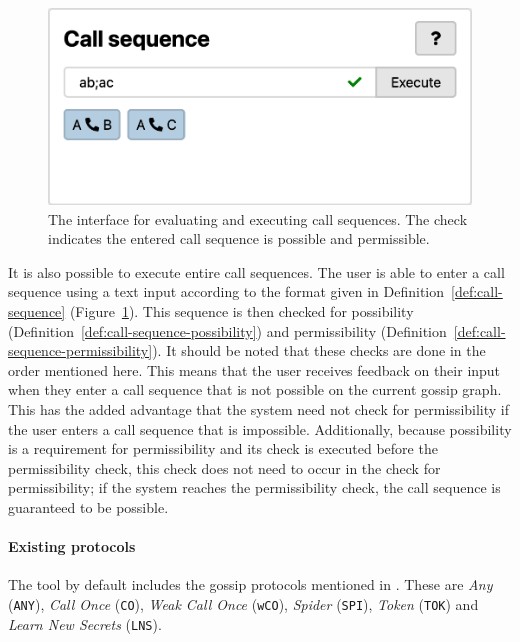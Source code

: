 \begin{figure}[htb!]
    \includegraphics[width=\linewidth]{img/call-sequence.png}
    \caption{The interface for evaluating and executing call sequences. The check indicates the entered call sequence is possible and permissible.}
    \label{fig:call-sequence}
\end{figure}

It is also possible to execute entire call sequences.
The user is able to enter a call sequence using a text input according to the format given in Definition~\ref{def:call-sequence} (Figure~\ref{fig:call-sequence}).
This sequence is then checked for possibility (Definition~\ref{def:call-sequence-possibility}) and permissibility (Definition~\ref{def:call-sequence-permissibility}).
It should be noted that these checks are done in the order mentioned here.
This means that the user receives feedback on their input when they enter a call sequence that is not possible on the current gossip graph.
This has the added advantage that the system need not check for permissibility if the user enters a call sequence that is impossible.
Additionally, because possibility is a requirement for permissibility and its check is executed before the permissibility check, this check does not need to occur in the check for permissibility;
if the system reaches the permissibility check, the call sequence is guaranteed to be possible.

\paragraph{Existing protocols}
\label{sec:existing-protocols}

The tool by default includes the gossip protocols mentioned in \textcite{van_ditmarsch_dynamic_2018}.
These are \emph{Any} (\texttt{ANY}), \emph{Call Once} (\texttt{CO}), \emph{Weak Call Once} (\texttt{wCO}), \emph{Spider} (\texttt{SPI}), \emph{Token} (\texttt{TOK}) and \emph{Learn New Secrets} (\texttt{LNS}).

